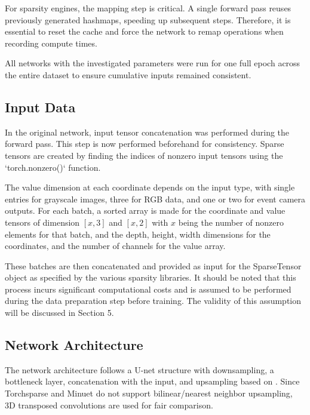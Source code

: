 \documentclass{article}
\begin{document}
For sparsity engines, the mapping step is critical. A single forward pass reuses previously generated hashmaps, speeding up subsequent steps. Therefore, it is essential to reset the cache and force the network to remap operations when recording compute times.

All networks with the investigated parameters were run for one full epoch across the entire dataset to ensure cumulative inputs remained consistent.

\subsection{Input Data}

In the original network, input tensor concatenation was performed during the forward pass. This step is now performed beforehand for consistency. Sparse tensors are created by finding the indices of nonzero input tensors using the `torch.nonzero()` function.

The value dimension at each coordinate depends on the input type, with single entries for grayscale images, three for RGB data, and one or two for event camera outputs. For each batch, a sorted array is made for the coordinate and value tensors of dimension \([x, 3]\) and \([x, 2]\) with \(x\) being the number of nonzero elements for that batch, and the depth, height, width dimensions for the coordinates, and the number of channels for the value array.

These batches are then concatenated and provided as input for the SparseTensor object as specified by the various sparsity libraries. It should be noted that this process incurs significant computational costs and is assumed to be performed during the data preparation step before training. The validity of this assumption will be discussed in Section 5.

\subsection{Network Architecture}

The network architecture follows a U-net structure with downsampling, a bottleneck layer, concatenation with the input, and upsampling based on \cite{hagenaars2021self}. Since Torchsparse and Minuet do not support bilinear/nearest neighbor upsampling, 3D transposed convolutions are used for fair comparison.
\end{document}
